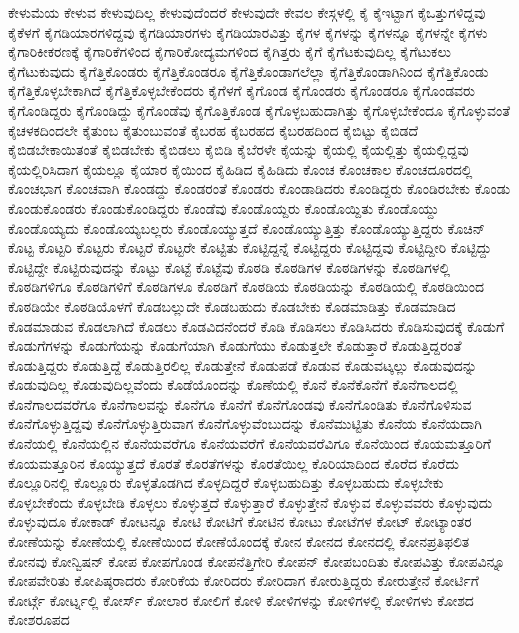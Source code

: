 {ಕೇಳುಮೆಯ
ಕೇಳುವ
ಕೇಳುವುದಿಲ್ಲ
ಕೇಳುವುದೆಂದರೆ
ಕೇಳುವುದೇ
ಕೇವಲ
ಕೇಸ್ಗಳಲ್ಲಿ
ಕೈ
ಕೈಇಟ್ಟಾಗ
ಕೈಒತ್ತುಗಳಿದ್ದವು
ಕೈಕೆಳಗೆ
ಕೈಗಡಿಯಾರಗಳಿದ್ದವು
ಕೈಗಡಿಯಾರಗಳು
ಕೈಗಡಿಯಾರವಿತ್ತು
ಕೈಗಳ
ಕೈಗಳನ್ನು
ಕೈಗಳನ್ನೂ
ಕೈಗಳನ್ನೇ
ಕೈಗಳು
ಕೈಗಾರಿಕೀಕರಣಕ್ಕೆ
ಕೈಗಾರಿಕೆಗಳಿಂದ
ಕೈಗಾರಿಕೋದ್ಯಮಗಳಿಂದ
ಕೈಗಿತ್ತರು
ಕೈಗೆ
ಕೈಗೆಟಕುವುದಿಲ್ಲ
ಕೈಗೆಟುಕಲು
ಕೈಗೆಟುಕುವುದು
ಕೈಗೆತ್ತಿಕೊಂಡರು
ಕೈಗೆತ್ತಿಕೊಂಡರೂ
ಕೈಗೆತ್ತಿಕೊಂಡಾಗಲೆಲ್ಲಾ
ಕೈಗೆತ್ತಿಕೊಂಡಾಗಿನಿಂದ
ಕೈಗೆತ್ತಿಕೊಂಡು
ಕೈಗೆತ್ತಿಕೊಳ್ಳಬೇಕಾಗಿದೆ
ಕೈಗೆತ್ತಿಕೊಳ್ಳಬೇಕೆಂದರು
ಕೈಗೆಳಗೆ
ಕೈಗೊಂಡ
ಕೈಗೊಂಡರು
ಕೈಗೊಂಡರೂ
ಕೈಗೊಂಡವರು
ಕೈಗೊಂಡಿದ್ದರು
ಕೈಗೊಂಡಿದ್ದು
ಕೈಗೊಂಡೆವು
ಕೈಗೊತ್ತಿಕೊಂಡ
ಕೈಗೊಳ್ಳಬಹುದಾಗಿತ್ತು
ಕೈಗೊಳ್ಳಬೇಕೆಂದೂ
ಕೈಗೊಳ್ಳುವಂತೆ
ಕೈಚಳಕದಿಂದಲೇ
ಕೈತುಂಬ
ಕೈತುಂಬುವಂತೆ
ಕೈಬರಹ
ಕೈಬರಹದ
ಕೈಬರಹದಿಂದ
ಕೈಬಿಟ್ಟು
ಕೈಬಿಡದೆ
ಕೈಬಿಡಬೇಕಾಯಿತಂತೆ
ಕೈಬಿಡಬೇಕು
ಕೈಬಿಡಲು
ಕೈಬಿಡಿ
ಕೈಬೆರಳೇ
ಕೈಯನ್ನು
ಕೈಯಲ್ಲಿ
ಕೈಯಲ್ಲಿತ್ತು
ಕೈಯಲ್ಲಿದ್ದವು
ಕೈಯಲ್ಲಿರಿಸಿದಾಗ
ಕೈಯಲ್ಲೂ
ಕೈಯಾರ
ಕೈಯಿಂದ
ಕೈಹಿಡಿದ
ಕೈಹಿಡಿದು
ಕೊಂಚ
ಕೊಂಚಕಾಲ
ಕೊಂಚದೂರದಲ್ಲಿ
ಕೊಂಚಭಾಗ
ಕೊಂಚವಾಗಿ
ಕೊಂಡದ್ದು
ಕೊಂಡರಂತೆ
ಕೊಂಡರು
ಕೊಂಡಾಡಿದರು
ಕೊಂಡಿದ್ದರು
ಕೊಂಡಿರಬೇಕು
ಕೊಂಡು
ಕೊಂಡುಕೊಂಡರು
ಕೊಂಡುಕೊಂಡಿದ್ದರು
ಕೊಂಡೆವು
ಕೊಂಡೊಯ್ದರು
ಕೊಂಡೊಯ್ದಿತು
ಕೊಂಡೊಯ್ದು
ಕೊಂಡೊಯ್ಯದು
ಕೊಂಡೊಯ್ಯಬಲ್ಲರು
ಕೊಂಡೊಯ್ಯುತ್ತದೆ
ಕೊಂಡೊಯ್ಯುತ್ತಿತ್ತು
ಕೊಂಡೊಯ್ಯುತ್ತಿದ್ದರು
ಕೊಚಿನ್
ಕೊಟ್ಟ
ಕೊಟ್ಟರಿ
ಕೊಟ್ಟರು
ಕೊಟ್ಟರೆ
ಕೊಟ್ಟರೇ
ಕೊಟ್ಟಿತು
ಕೊಟ್ಟಿದ್ದನ್ನೆ
ಕೊಟ್ಟಿದ್ದರು
ಕೊಟ್ಟಿದ್ದವು
ಕೊಟ್ಟಿದ್ದೀರಿ
ಕೊಟ್ಟಿದ್ದು
ಕೊಟ್ಟಿದ್ದೇ
ಕೊಟ್ಟಿರುವುದನ್ನು
ಕೊಟ್ಟು
ಕೊಟ್ಟೆ
ಕೊಟ್ಟೆವು
ಕೊಠಡಿ
ಕೊಠಡಿಗಳ
ಕೊಠಡಿಗಳನ್ನು
ಕೊಠಡಿಗಳಲ್ಲಿ
ಕೊಠಡಿಗಳಿಗೂ
ಕೊಠಡಿಗಳಿಗೆ
ಕೊಠಡಿಗಳೂ
ಕೊಠಡಿಗೆ
ಕೊಠಡಿಯ
ಕೊಠಡಿಯನ್ನು
ಕೊಠಡಿಯಲ್ಲಿ
ಕೊಠಡಿಯಿಂದ
ಕೊಠಡಿಯೇ
ಕೊಠಡಿಯೊಳಗೆ
ಕೊಡಬಲ್ಲುದೇ
ಕೊಡಬಹುದು
ಕೊಡಬೇಕು
ಕೊಡಮಾಡಿತ್ತು
ಕೊಡಮಾಡಿದ
ಕೊಡಮಾಡುವ
ಕೊಡಲಾಗಿದೆ
ಕೊಡಲು
ಕೊಡವಿದನೆಂದರೆ
ಕೊಡಿ
ಕೊಡಿಸಲು
ಕೊಡಿಸಿದರು
ಕೊಡಿಸುವುದಕ್ಕೆ
ಕೊಡುಗೆ
ಕೊಡುಗೆಗಳನ್ನು
ಕೊಡುಗೆಯನ್ನು
ಕೊಡುಗೆಯಾಗಿ
ಕೊಡುಗೆಯು
ಕೊಡುತ್ತಲೇ
ಕೊಡುತ್ತಾರೆ
ಕೊಡುತ್ತಿದ್ದರಂತೆ
ಕೊಡುತ್ತಿದ್ದರು
ಕೊಡುತ್ತಿದ್ದೆ
ಕೊಡುತ್ತಿರಲಿಲ್ಲ
ಕೊಡುತ್ತೇನೆ
ಕೊಡುಪಡೆ
ಕೊಡುವ
ಕೊಡುವಟ್ಕಲ್ಲು
ಕೊಡುವುದನ್ನು
ಕೊಡುವುದಿಲ್ಲ
ಕೊಡುವುದಿಲ್ಲವೆಂದು
ಕೊಡೆಯೊಂದನ್ನು
ಕೊಣೆಯಲ್ಲಿ
ಕೊನೆ
ಕೊನೆಕೊನೆಗೆ
ಕೊನೆಗಾಲದಲ್ಲಿ
ಕೊನೆಗಾಲದವರೆಗೂ
ಕೊನೆಗಾಲವನ್ನು
ಕೊನೆಗೂ
ಕೊನೆಗೆ
ಕೊನೆಗೊಂಡವು
ಕೊನೆಗೊಂಡಿತು
ಕೊನೆಗೊಳಿಸುವ
ಕೊನೆಗೊಳ್ಳುತ್ತಿದ್ದವು
ಕೊನೆಗೊಳ್ಳುತ್ತಿರುವಾಗ
ಕೊನೆಗೊಳ್ಳುವೆಂಬುದನ್ನು
ಕೊನೆಮುಟ್ಟಿತು
ಕೊನೆಯ
ಕೊನೆಯದಾಗಿ
ಕೊನೆಯಲ್ಲಿ
ಕೊನೆಯಲ್ಲಿನ
ಕೊನೆಯವರೆಗೂ
ಕೊನೆಯವರೆಗೆ
ಕೊನೆಯವರೆವಿಗೂ
ಕೊನೆಯಿಂದ
ಕೊಯಮತ್ತೂರಿಗೆ
ಕೊಯಮತ್ತೂರಿನ
ಕೊಯ್ಯುತ್ತದೆ
ಕೊರತೆ
ಕೊರತೆಗಳನ್ನು
ಕೊರತೆಯಿಲ್ಲ
ಕೊರಿಯಾದಿಂದ
ಕೊರೆದ
ಕೊರೆದು
ಕೊಲ್ಲೂರಿನಲ್ಲಿ
ಕೊಲ್ಲೂರು
ಕೊಳ್ಳತೊಡಗಿದ
ಕೊಳ್ಳದಿದ್ದರೆ
ಕೊಳ್ಳಬಹುದಿತ್ತು
ಕೊಳ್ಳಬಹುದು
ಕೊಳ್ಳಬೇಕು
ಕೊಳ್ಳಬೇಕೆಂದು
ಕೊಳ್ಳಬೇಡಿ
ಕೊಳ್ಳಲು
ಕೊಳ್ಳುತ್ತದೆ
ಕೊಳ್ಳುತ್ತಾರೆ
ಕೊಳ್ಳುತ್ತೇನೆ
ಕೊಳ್ಳುವ
ಕೊಳ್ಳುವವರು
ಕೊಳ್ಳುವುದು
ಕೊಳ್ಳುವುದೂ
ಕೋಕಾಡ್
ಕೋಟನ್ನೂ
ಕೋಟಿ
ಕೋಟಿಗೆ
ಕೋಟಿನ
ಕೋಟು
ಕೋಟೆಗಳ
ಕೋಟ್
ಕೋಟ್ಯಾಂತರ
ಕೋಣೆಯನ್ನು
ಕೋಣೆಯಲ್ಲಿ
ಕೋಣೆಯಿಂದ
ಕೋಣೆಯೊಂದಕ್ಕೆ
ಕೋನ
ಕೋನದ
ಕೋನದಲ್ಲಿ
ಕೋನಪ್ರತಿಫಲಿತ
ಕೋನವು
ಕೋನ್ವಿಷನ್
ಕೋಪ
ಕೋಪಗೊಂಡ
ಕೋಪನೆತ್ತಿಗೇರಿ
ಕೋಪನ್
ಕೋಪಬಂದಿತು
ಕೋಪವಿತ್ತು
ಕೋಪವಿನ್ನೂ
ಕೋಪವೇರಿತು
ಕೋಪಿಷ್ಠರಾದರು
ಕೋರಿಕೆಯ
ಕೋರಿದರು
ಕೋರಿದಾಗ
ಕೋರುತ್ತಿದ್ದರು
ಕೋರುತ್ತೇನೆ
ಕೋರ್ಟಿಗೆ
ಕೋರ್ಟ್ಗೆ
ಕೋರ್ಟ್ನಲ್ಲಿ
ಕೋರ್ಸ್
ಕೋಲಾರ
ಕೋಲಿಗೆ
ಕೋಳಿ
ಕೋಳಿಗಳನ್ನು
ಕೋಳಿಗಳಲ್ಲಿ
ಕೋಳಿಗಳು
ಕೋಶದ
ಕೋಶರೂಪದ
}
